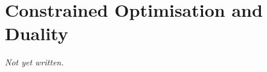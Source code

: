 \chapter{Constrained Optimisation and Duality}\label{ch:constrained-optimisation}


\textit{Not yet written.}

